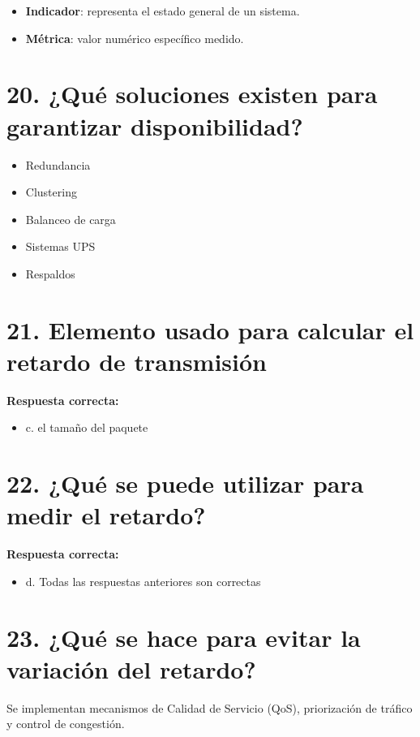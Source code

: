 \documentclass[12pt]{article}
\begin{document}
\begin{itemize}
    \item \textbf{Indicador}: representa el estado general de un sistema.
    \item \textbf{Métrica}: valor numérico específico medido.
\end{itemize}

\section*{20. ¿Qué soluciones existen para garantizar disponibilidad?}

\begin{itemize}
    \item Redundancia
    \item Clustering
    \item Balanceo de carga
    \item Sistemas UPS
    \item Respaldos
\end{itemize}

\section*{21. Elemento usado para calcular el retardo de transmisión}

\textbf{Respuesta correcta:}

\begin{itemize}
    \item c. el tamaño del paquete
\end{itemize}

\section*{22. ¿Qué se puede utilizar para medir el retardo?}

\textbf{Respuesta correcta:}

\begin{itemize}
    \item d. Todas las respuestas anteriores son correctas
\end{itemize}

\section*{23. ¿Qué se hace para evitar la variación del retardo?}

Se implementan mecanismos de Calidad de Servicio (QoS), priorización de tráfico y control de congestión.
\end{document}
